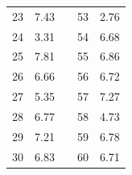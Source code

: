\begin{table}[H]
\begin{tabular}{|r|r|l|r|r|}
  23                                                        & 7.43                                                      &  & 53                                                                              & 2.76                                                                             \\ \cline{1-2} \cline{4-5} 
  24                                                        & 3.31                                                      &  & 54                                                                              & 6.68                                                                             \\ \cline{1-2} \cline{4-5} 
  25                                                        & 7.81                                                      &  & 55                                                                              & 6.86                                                                             \\ \cline{1-2} \cline{4-5} 
  26                                                        & 6.66                                                      &  & 56                                                                              & 6.72                                                                             \\ \cline{1-2} \cline{4-5} 
  27                                                        & 5.35                                                      &  & 57                                                                              & 7.27                                                                             \\ \cline{1-2} \cline{4-5} 
  28                                                        & 6.77                                                      &  & 58                                                                              & 4.73                                                                             \\ \cline{1-2} \cline{4-5} 
  29                                                        & 7.21                                                      &  & 59                                                                              & 6.78                                                                             \\ \cline{1-2} \cline{4-5} 
  30                                                        & 6.83                                                      &  & 60                                                                              & 6.71                                                                             \\ \cline{1-2} \cline{4-5} 
  \end{tabular}
\end{table}

